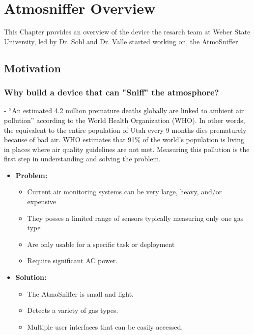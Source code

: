 \chapter{Atmosniffer Overview} %
This Chapter provides an overview of the device the resarch team at Weber State University, led by Dr. Sohl and Dr. Valle started working on, the AtmoSniffer.

\section{Motivation}

\subsection{Why build a device that can "Sniff" the atmosphore?}
- “An estimated 4.2 million premature deaths globally are linked to ambient air pollution” according to the World Health Organization (WHO). In other words, the equivalent to the entire population of Utah every 9 months dies prematurely because of bad air. WHO estimates that 91\% of the world’s population is living in places where air quality guidelines are not met.\cite{who} Measuring this pollution is the first step in understanding and solving the problem. 


\begin{itemize}
\item \textbf{Problem:}
	\begin{itemize}
	\item Current air monitoring systems can be very large, heavy, and/or expensive
	\item They posses a limited range of sensors typically measuring only one gas type
	\item Are only usable for a specific task or deployment
	\item Require significant AC power.
	\end{itemize}

\item \textbf{Solution:}
	\begin{itemize}
	\item The AtmoSniffer is small and light.
	\item Detects a variety of gas types.
	\item Multiple user interfaces that can be easily accessed.
	\end{itemize}

\end{itemize}

